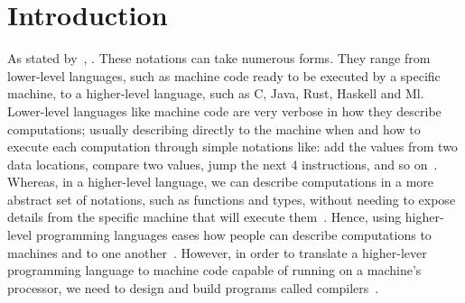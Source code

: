 \documentclass[
  oneside,
  english,
  coorientadorbanca,
  noabntexcite
]{ufsc-thesis-rn46-2019}
\begin{document}

\tableofcontents*

\textual{}

\chapter{Introduction}\label{chapter:introduction}

As stated by~\textcite{Aho:2006:CPT:1177220}, .
These notations can take numerous forms.
They range from lower-level languages, such as machine code ready to be executed by a specific machine, to a higher-level language, such as C, Java, Rust, Haskell and Ml.
Lower-level languages like machine code are very verbose in how they describe computations; usually describing directly to the machine when and how to execute each computation through simple notations like: add the values from two data locations, compare two values, jump the next 4 instructions, and so on~\cite{Aho:2006:CPT:1177220}.
Whereas, in a higher-level language, we can describe computations in a more abstract set of notations, such as functions and types, without needing to expose details from the specific machine that will execute them~\cite{Aho:2006:CPT:1177220}.
Hence, using higher-level programming languages eases how people can describe computations to machines and to one another~\cite{Aho:2006:CPT:1177220}.
However, in order to translate a higher-lever programming language to machine code capable of running on a machine's processor, we need to design and build programs called compilers~\cite{Aho:2006:CPT:1177220}.
\end{document}
